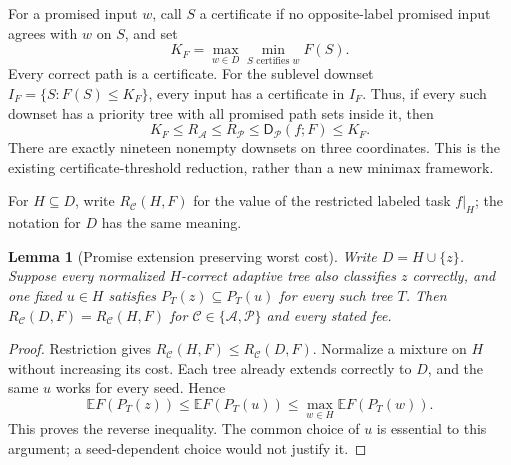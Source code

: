 \documentclass[pdflatex,sn-mathphys-num]{sn-jnl}
\newcommand{\DR}{\mathsf{D}}
\theoremstyle{thmstyleone}
\newtheorem{lemma}[theorem]{Lemma}
\theoremstyle{thmstylethree}
\theoremstyle{thmstyletwo}
\begin{document}
For a promised input $w$, call $S$ a certificate if no opposite-label
promised input agrees with $w$ on $S$, and set
\[
 K_F=\max_{w\in D}\min_{S\text{ certifies }w}F(S).
\]
Every correct path is a certificate. For the sublevel downset
$I_F=\{S:F(S)\leq K_F\}$, every input has a certificate in $I_F$.
Thus, if every such downset has a priority tree with all promised path
sets inside it, then
\[
 K_F\leq R_{\mathcal A}\leq R_{\mathcal P}
       \leq \DR_{\mathcal P}(f;F)\leq K_F.
\]
There are exactly nineteen nonempty downsets on three coordinates.
This is the existing certificate-threshold reduction, rather than a
new minimax framework.

For $H\subseteq D$, write $R_{\mathcal C}(H,F)$ for the value of the
restricted labeled task $f|_H$; the notation for $D$ has the same meaning.

\begin{lemma}[Promise extension preserving worst cost]
\label{lem:generic-promise-extension}
Write $D=H\cup\{z\}$. Suppose every normalized $H$-correct adaptive tree
also classifies $z$ correctly, and one fixed $u\in H$ satisfies
$P_T(z)\subseteq P_T(u)$ for every such tree $T$. Then
$R_{\mathcal C}(D,F)=R_{\mathcal C}(H,F)$ for
$\mathcal C\in\{\mathcal A,\mathcal P\}$ and every stated fee.
\end{lemma}
\begin{proof}
Restriction gives $R_{\mathcal C}(H,F)\leq R_{\mathcal C}(D,F)$.
Normalize a mixture on $H$ without increasing its cost. Each tree already
extends correctly to $D$, and the same $u$ works for every seed. Hence
\[
 \mathbb E F(P_T(z))\leq
 \mathbb E F(P_T(u))\leq
 \max_{w\in H}\mathbb E F(P_T(w)).
\]
This proves the reverse inequality. The common choice of $u$ is essential
to this argument; a seed-dependent choice would not justify it.
\end{proof}
\end{document}
